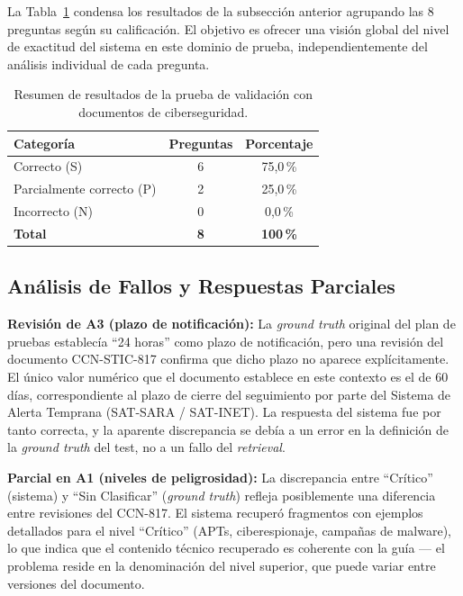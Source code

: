 La Tabla~\ref{tab:resumen_cyber} condensa los resultados de la subsección anterior agrupando las 8 preguntas según su calificación. El objetivo es ofrecer una visión global del nivel de exactitud del sistema en este dominio de prueba, independientemente del análisis individual de cada pregunta.

\begin{table}[ht]
\centering
\begin{tabular}{|l|c|c|}
\hline
\textbf{Categoría} & \textbf{Preguntas} & \textbf{Porcentaje} \\ \hline
Correcto (S) & 6 & 75{,}0\,\% \\ \hline
Parcialmente correcto (P) & 2 & 25{,}0\,\% \\ \hline
Incorrecto (N) & 0 & 0{,}0\,\% \\ \hline
\textbf{Total} & \textbf{8} & \textbf{100\,\%} \\ \hline
\end{tabular}
\caption{Resumen de resultados de la prueba de validación con documentos de ciberseguridad.}
\label{tab:resumen_cyber}
\end{table}

\subsection{Análisis de Fallos y Respuestas Parciales}\label{sec:analisis_fallos}

\textbf{Revisión de A3 (plazo de notificación):} La \textit{ground truth} original del plan de pruebas establecía ``24 horas'' como plazo de notificación, pero una revisión del documento CCN-STIC-817 confirma que dicho plazo no aparece explícitamente. El único valor numérico que el documento establece en este contexto es el de 60 días, correspondiente al plazo de cierre del seguimiento por parte del Sistema de Alerta Temprana (SAT-SARA / SAT-INET). La respuesta del sistema fue por tanto correcta, y la aparente discrepancia se debía a un error en la definición de la \textit{ground truth} del test, no a un fallo del \textit{retrieval}.

\textbf{Parcial en A1 (niveles de peligrosidad):} La discrepancia entre ``Crítico'' (sistema) y ``Sin Clasificar'' (\textit{ground truth}) refleja posiblemente una diferencia entre revisiones del CCN-817. El sistema recuperó fragmentos con ejemplos detallados para el nivel ``Crítico'' (APTs, ciberespionaje, campañas de malware), lo que indica que el contenido técnico recuperado es coherente con la guía — el problema reside en la denominación del nivel superior, que puede variar entre versiones del documento.

